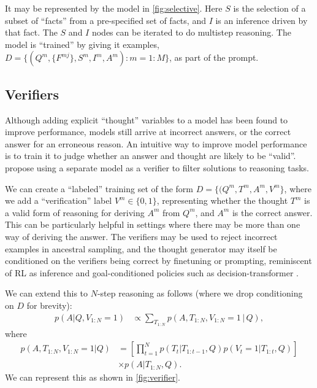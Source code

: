 It may be represented by the model in \cref{fig:selective}. Here $S$ is the selection of a subset of ``facts''
from a pre-specified set of facts,
and $I$ is an inference driven by that fact.
The $S$ and $I$ nodes
can be iterated to do multistep reasoning.
The model is ``trained'' by giving it examples,
$D = \{ (Q^m, \{F^{mj}\}, S^m, I^m, A^m): m=1:M\}$,
as part of the prompt.



\subsection{Verifiers}
\label{sec:verifiers}

Although adding explicit ``thought'' variables to a model
has been found to improve performance, models still arrive at incorrect answers, or the correct answer for an erroneous reason.
An intuitive way to improve model performance is to train it to judge whether an answer and thought are likely to be ``valid''. \citet{verifiers} propose using a separate model as a verifier to filter solutions to reasoning tasks.

We can create a ``labeled'' training
set of the form
$D = \{ (Q^m, T^m, A^m, V^m\}$,
where we add a ``verification'' label 
$V^m \in \{0, 1 \}$,
representing whether the thought $T^m$
is a valid form of reasoning for deriving
$A^m$ from $Q^m$, and $A^m$ is the correct answer.
This can be particularly helpful in settings
where there may be more than one way of deriving
the answer. The verifiers may be used to reject incorrect examples in ancestral sampling, and the thought generator may itself be conditioned on the verifiers being correct by finetuning or prompting, reminiscent of RL as inference \cite{rl_inference} and goal-conditioned policies such as decision-transformer \cite{decision_transformer}.

%
%
%


We can extend this to  $N$-step reasoning as follows
(where  we drop conditioning on $D$
for brevity):
{\footnotesize
\begin{align*}
p(A|Q,V_{1:N}=1)
&\propto \sum_{T_{1:N}}
p(A,T_{1:N},V_{1:N}=1\,|\,Q),
\end{align*}
}
where
{\footnotesize
\begin{align*}
p(A,T_{1:N},V_{1:N}=1|Q)
&= \left[ \prod_{t=1}^N p(T_t|T_{1:t-1},Q)
p(V_t=1|T_{1:t},Q) \right] \\
& \times p(A|T_{1:N},Q).
\end{align*}
}
\noindent We can represent this 
as shown in \cref{fig:verifier}.

